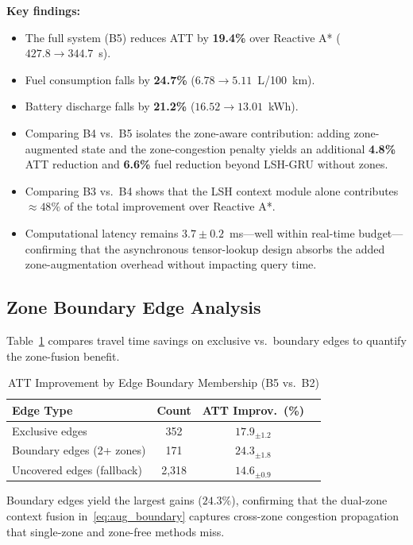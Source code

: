 \documentclass[journal,letterpaper,10pt]{IEEEtran}
\theoremstyle{definition}
\theoremstyle{remark}
\begin{document}
\noindent\textbf{Key findings:}
\begin{itemize}
  \item The full system (B5) reduces ATT by \textbf{19.4\%}
    over Reactive A* ($427.8\to344.7$~s).
  \item Fuel consumption falls by \textbf{24.7\%}
    ($6.78\to5.11$~L/100~km).
  \item Battery discharge falls by \textbf{21.2\%}
    ($16.52\to13.01$~kWh).
  \item Comparing B4 vs.\ B5 isolates the zone-aware contribution:
    adding zone-augmented state and the zone-congestion penalty
    yields an additional \textbf{4.8\%} ATT reduction and
    \textbf{6.6\%} fuel reduction beyond LSH-GRU without zones.
  \item Comparing B3 vs.\ B4 shows that the LSH context module
    alone contributes $\approx\!48\%$ of the total improvement
    over Reactive A*.
  \item Computational latency remains $3.7\pm0.2$~ms---well within
    real-time budget---confirming that the asynchronous tensor-lookup
    design absorbs the added zone-augmentation overhead without
    impacting query time.
\end{itemize}

\subsection{Zone Boundary Edge Analysis}

Table~\ref{tab:boundary} compares travel time savings on exclusive
vs.\ boundary edges to quantify the zone-fusion benefit.

\begin{table}[!t]
\renewcommand{\arraystretch}{1.25}
\caption{ATT Improvement by Edge Boundary Membership (B5 vs.\ B2)}
\label{tab:boundary}
\centering
\begin{tabular}{lccc}
\toprule
\rowcolor{gray!15}
\textbf{Edge Type} & \textbf{Count} & \textbf{ATT Improv.\ (\%)} \\
\midrule
Exclusive edges      & 352  & $17.9_{\pm1.2}$ \\
Boundary edges (2+ zones) & 171  & $24.3_{\pm1.8}$ \\
Uncovered edges (fallback) & 2{,}318 & $14.6_{\pm0.9}$ \\
\bottomrule
\end{tabular}
\end{table}

Boundary edges yield the largest gains ($24.3\%$), confirming that
the dual-zone context fusion in~\eqref{eq:aug_boundary} captures
cross-zone congestion propagation that single-zone and zone-free
methods miss.
\end{document}

